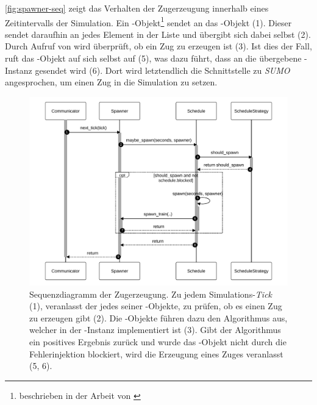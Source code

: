 \autoref{fig:spawner-seq} zeigt das Verhalten der Zugerzeugung innerhalb eines Zeitintervalls der Simulation. Ein -Objekt\footnote{beschrieben in der Arbeit von \citeauthor{kamp_architektur_2023} \cite{kamp_architektur_2023}} sendet  an das -Objekt (1). Dieser sendet daraufhin  an jedes Element in der Liste  und übergibt sich dabei selbst (2). Durch Aufruf von  wird überprüft, ob ein Zug zu erzeugen ist (3). Ist dies der Fall, ruft das -Objekt auf sich selbst  auf (5), was dazu führt, dass  an die übergebene -Instanz gesendet wird (6). Dort wird letztendlich die Schnittstelle zu \emph{SUMO} angesprochen, um einen Zug in die Simulation zu setzen.

\begin{figure}[!ht]
	\centering
	\includegraphics[width=1.0\linewidth]{images/diagrams/spawner-seq.pdf}
	\caption{Sequenzdiagramm der Zugerzeugung. Zu jedem Simulations-\emph{Tick} (1), veranlasst der  jedes seiner -Objekte, zu prüfen, ob es einen Zug zu erzeugen gibt (2). Die -Objekte führen dazu den Algorithmus aus, welcher in der -Instanz implementiert ist (3). Gibt der Algorithmus ein positives Ergebnis zurück und wurde das -Objekt nicht durch die Fehlerinjektion blockiert, wird die Erzeugung eines Zuges veranlasst (5, 6).}
	\label{fig:spawner-seq}
\end{figure}

